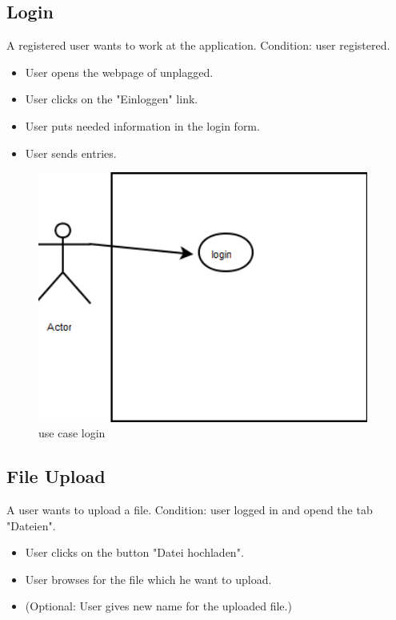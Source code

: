 \subsection{Login}
A registered user wants to work at the application.
\minisec{}
Condition: user registered.
\minisec{}
\begin{itemize}
\item User opens the webpage of unplagged.
\item User clicks on the "Einloggen" link.
\item User puts needed information in the login form.
\item User sends entries.
\end{itemize}
\begin{figure}[!ht]
  \centering
    \includegraphics[width=0.97\textwidth]{images/use_cases/login.png}
  \caption{use case login}
  \label{fig:use case login}
\end{figure}

\subsection{File Upload}
A user wants to upload a file.
\minisec{}
Condition: user logged in and opend the tab "Dateien".
\minisec{}
\begin{itemize}
\item User clicks on the button "Datei hochladen".
\item User browses for the file which he want to upload.
\item (Optional: User gives new name for the uploaded file.)
\end{itemize}

